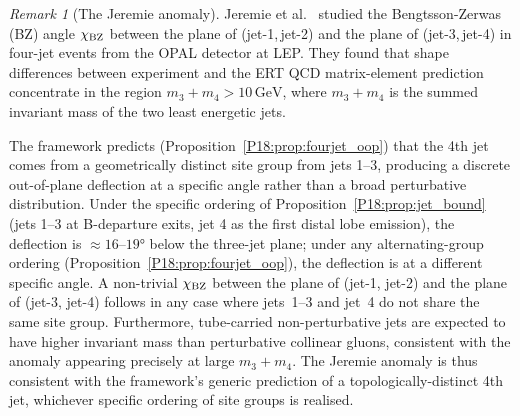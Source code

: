 \documentclass[11pt,a4paper]{article}
\theoremstyle{definition}\newtheorem{definition}[theorem]{Definition}
\theoremstyle{remark}
\newtheorem{remark}[theorem]{Remark}
\begin{document}
\begin{remark}[The Jeremie anomaly]
\label{P18:rem:jeremie}
Jeremie et al.~\cite{Jeremie2006} studied the Bengtsson-Zerwas
(BZ) angle $\chi_{\rm BZ}$ between the plane of (jet-1,\,jet-2)
and the plane of (jet-3,\,jet-4) in four-jet events from the OPAL
detector at LEP.  They found that shape differences between
experiment and the ERT QCD matrix-element prediction concentrate
in the region $m_3+m_4>10\,\mathrm{GeV}$, where $m_3+m_4$ is
the summed invariant mass of the two least energetic jets.

The framework predicts (Proposition~\ref{P18:prop:fourjet_oop}) that
the 4th jet comes from a geometrically distinct site group from
jets 1--3, producing a discrete out-of-plane deflection at a
specific angle rather than a broad perturbative distribution.
Under the specific ordering of Proposition~\ref{P18:prop:jet_bound}
(jets 1--3 at B-departure exits, jet 4 as the first distal lobe
emission), the deflection is $\approx16$--$19°$ below the
three-jet plane; under any alternating-group ordering
(Proposition~\ref{P18:prop:fourjet_oop}), the deflection is at a
different specific angle.  A non-trivial $\chi_{\rm BZ}$ between
the plane of (jet-1, jet-2) and the plane of (jet-3, jet-4)
follows in any case where jets~1--3 and jet~4 do not share the
same site group.  Furthermore, tube-carried non-perturbative jets
are expected to have higher invariant mass than perturbative
collinear gluons, consistent with the anomaly appearing precisely
at large $m_3+m_4$.  The Jeremie anomaly is thus consistent with
the framework's generic prediction of a topologically-distinct
4th jet, whichever specific ordering of site groups is realised.
\end{remark}
\end{document}
